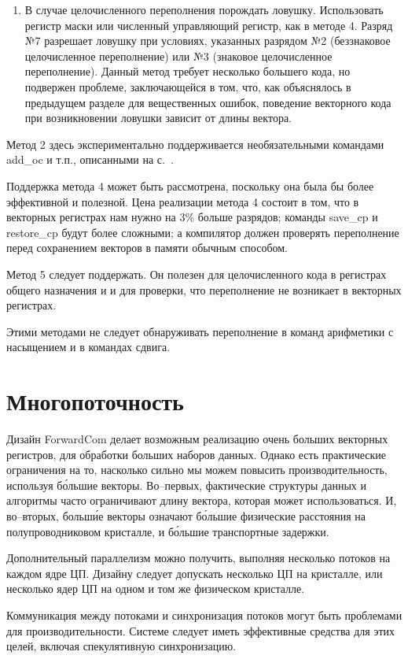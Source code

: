 \documentclass[forwardcom.tex]{subfiles}
\begin{document}
\begin{enumerate}
    \item В случае целочисленного переполнения порождать ловушку. Использовать регистр маски или численный управляющий регистр, как в методе 4. Разряд №7 разрешает ловушку при условиях, указанных разрядом №2 (беззнаковое целочисленное переполнение) или №3 (знаковое целочисленное переполнение). Данный метод требует несколько большего кода, но подвержен проблеме, заключающейся в том, что, как объяснялось в предыдущем разделе для вещественных ошибок, поведение векторного кода при возникновении ловушки зависит от длины вектора.
\end{enumerate}

Метод 2 здесь экспериментально поддерживается необязательными командами add\_oc и т.п., описанными на с.~\pageref{instructionsWithOverflowCheck}. 

Поддержка метода 4 может быть рассмотрена, поскольку она была бы более эффективной и полезной. Цена реализации метода 4 состоит в том, что в векторных регистрах нам нужно на 3\% больше разрядов; команды save\_cp и restore\_cp будут более сложными; а компилятор должен проверять переполнение перед сохранением векторов в памяти обычным способом.

Метод 5 следует поддержать. Он полезен для целочисленного кода в регистрах общего назначения и и для проверки, что переполнение не возникает в векторных регистрах.

Этими методами не следует обнаруживать переполнение в команд арифметики с насыщением  и в командах сдвига.

\section{Многопоточность}
Дизайн ForwardCom делает возможным реализацию очень больших векторных регистров, для обработки больших наборов данных. Однако есть практические ограничения на то, насколько сильно мы можем повысить производительность, используя б\'{о}льшие векторы. Во--первых, фактические структуры данных и алгоритмы часто ограничивают длину вектора, которая может использоваться. И, во--вторых, больш\'{и}е векторы означают б\'{о}льшие физические расстояния на полупроводниковом кристалле, и б\'{о}льшие транспортные задержки.

Дополнительный параллелизм можно получить, выполняя несколько потоков на каждом ядре ЦП. Дизайну следует допускать несколько ЦП на кристалле, или несколько ядер ЦП на одном и том же физическом кристалле.

Коммуникация между потоками и синхронизация потоков могут быть проблемами для производительности. Системе следует иметь эффективные средства для этих целей, включая спекулятивную синхронизацию.
\end{document}
